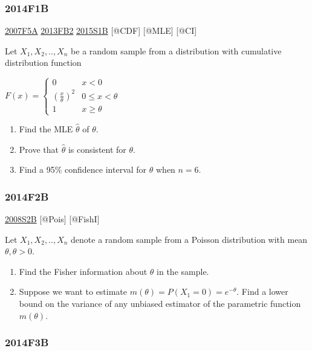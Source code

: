 \documentclass[6pt,twocolumn,Portrait]{article}
\begin{document}
\hypertarget{f1b-1}{%
\subsubsection{2014F1B}\label{f1b-1}}

\protect\hyperlink{f5a}{2007F5A} \protect\hyperlink{fb2-2}{2013FB2}
\protect\hyperlink{s1b-1}{2015S1B} {[}@CDF{]} {[}@MLE{]} {[}@CI{]}

Let \(X_1,X_2,..,X_n\) be a random sample from a distribution with
cumulative distribution function

\(F(x)=\begin{cases}0&x<0\\(\frac{x}\theta)^2& 0\le x<\theta\\1& x\ge\theta\end{cases}\)

\begin{enumerate}
\def\labelenumi{(\alph{enumi})}
\item
  Find the MLE \(\hat\theta\) of \(\theta\).
\item
  Prove that \(\hat\theta\) is consistent for \(\theta\).
\item
  Find a 95\% confidence interval for \(\theta\) when \(n=6\).
\end{enumerate}

\hypertarget{f2b-1}{%
\subsubsection{2014F2B}\label{f2b-1}}

\protect\hyperlink{s2b}{2008S2B} {[}@Pois{]} {[}@FishI{]}

Let \(X_1,X_2,..,X_{n}\) denote a random sample from a Poisson
distribution with mean \(\theta,\theta>0\).

\begin{enumerate}
\def\labelenumi{(\alph{enumi})}
\item
  Find the Fisher information about \(\theta\) in the sample.
\item
  Suppose we want to estimate \(m(\theta)=P(X_1=0)=e^{-\theta}\). Find a
  lower bound on the variance of any unbiased estimator of the
  parametric function \(m(\theta)\).
\end{enumerate}

\hypertarget{f3b-1}{%
\subsubsection{2014F3B}\label{f3b-1}}
\end{document}
